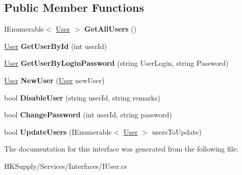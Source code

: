 \subsection*{Public Member Functions}
\begin{DoxyCompactItemize}
\item 
\mbox{\label{interface_h_k_supply_1_1_services_1_1_interfaces_1_1_i_user_ab18e28f31a3a14a63df31f17991aeb43}} 
I\+Enumerable$<$ \hyperlink{class_h_k_supply_1_1_models_1_1_user}{User} $>$ {\bfseries Get\+All\+Users} ()
\item 
\mbox{\label{interface_h_k_supply_1_1_services_1_1_interfaces_1_1_i_user_a49a1d525d5ab93f26cbe66b1f22abe1a}} 
\hyperlink{class_h_k_supply_1_1_models_1_1_user}{User} {\bfseries Get\+User\+By\+Id} (int user\+Id)
\item 
\mbox{\label{interface_h_k_supply_1_1_services_1_1_interfaces_1_1_i_user_a814c835f9375a134f01ad961e27d7314}} 
\hyperlink{class_h_k_supply_1_1_models_1_1_user}{User} {\bfseries Get\+User\+By\+Login\+Password} (string User\+Login, string Password)
\item 
\mbox{\label{interface_h_k_supply_1_1_services_1_1_interfaces_1_1_i_user_a0f68a7ca2668977e45d199ea21522a98}} 
\hyperlink{class_h_k_supply_1_1_models_1_1_user}{User} {\bfseries New\+User} (\hyperlink{class_h_k_supply_1_1_models_1_1_user}{User} new\+User)
\item 
\mbox{\label{interface_h_k_supply_1_1_services_1_1_interfaces_1_1_i_user_af241b1a787265f454b2d5b33a8514ff0}} 
bool {\bfseries Disable\+User} (string user\+Id, string remarks)
\item 
\mbox{\label{interface_h_k_supply_1_1_services_1_1_interfaces_1_1_i_user_a437f1837393b7a306de3fecdce176c97}} 
bool {\bfseries Change\+Password} (int user\+Id, string password)
\item 
\mbox{\label{interface_h_k_supply_1_1_services_1_1_interfaces_1_1_i_user_a61282883d17b0cf41a07a93e9bd49db7}} 
bool {\bfseries Update\+Users} (I\+Enumerable$<$ \hyperlink{class_h_k_supply_1_1_models_1_1_user}{User} $>$ users\+To\+Update)
\end{DoxyCompactItemize}


The documentation for this interface was generated from the following file\+:\begin{DoxyCompactItemize}
\item 
H\+K\+Supply/\+Services/\+Interfaces/I\+User.\+cs\end{DoxyCompactItemize}
